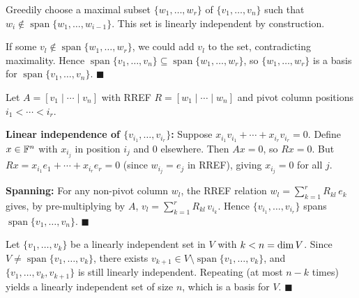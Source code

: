 \begin{proofbox}
Greedily choose a maximal subset $\{w_1,\ldots,w_r\}$ of
$\{v_1,\ldots,v_n\}$ such that $w_i\notin\operatorname{span}\{w_1,\ldots,w_{i-1}\}$.
This set is linearly independent by construction.

If some $v_l\notin\operatorname{span}\{w_1,\ldots,w_r\}$, we could add $v_l$
to the set, contradicting maximality.  Hence
$\operatorname{span}\{v_1,\ldots,v_n\}\subseteq\operatorname{span}\{w_1,\ldots,w_r\}$,
so $\{w_1,\ldots,w_r\}$ is a basis for
$\operatorname{span}\{v_1,\ldots,v_n\}$. \hfill$\blacksquare$
\end{proofbox}

\begin{proofbox}
Let $A=[v_1\mid\cdots\mid v_n]$ with RREF $R=[w_1\mid\cdots\mid w_n]$ and
pivot column positions $i_1<\cdots<i_r$.

\textbf{Linear independence of $\{v_{i_1},\ldots,v_{i_r}\}$:}
Suppose $x_{i_1}v_{i_1}+\cdots+x_{i_r}v_{i_r}=0$.  Define
$x\in\mathbb{F}^n$ with $x_{i_j}$ in position $i_j$ and $0$ elsewhere.
Then $Ax=0$, so $Rx=0$.  But $Rx=x_{i_1}e_1+\cdots+x_{i_r}e_r=0$
(since $w_{i_j}=e_j$ in RREF), giving $x_{i_j}=0$ for all $j$.

\textbf{Spanning:} For any non-pivot column $w_l$, the RREF relation
$w_l=\sum_{k=1}^r R_{kl}\,e_k$ gives, by pre-multiplying by $A$,
$v_l=\sum_{k=1}^r R_{kl}\,v_{i_k}$.
Hence $\{v_{i_1},\ldots,v_{i_r}\}$ spans $\operatorname{span}\{v_1,\ldots,v_n\}$.
\hfill$\blacksquare$
\end{proofbox}

\begin{proofbox}
Let $\{v_1,\ldots,v_k\}$ be a linearly independent set in $V$ with
$k<n=\operatorname{dim} V$.  Since $V\neq\operatorname{span}\{v_1,\ldots,v_k\}$, there
exists $v_{k+1}\in V\setminus\operatorname{span}\{v_1,\ldots,v_k\}$, and
$\{v_1,\ldots,v_k,v_{k+1}\}$ is still linearly independent.  Repeating
(at most $n-k$ times) yields a linearly independent set of size $n$, which
is a basis for $V$. \hfill$\blacksquare$
\end{proofbox}


